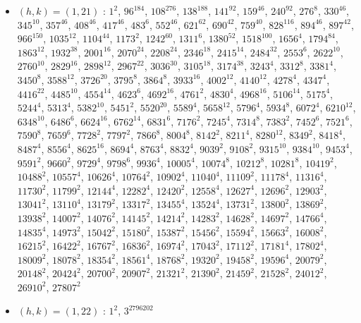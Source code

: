 \begin{itemize}
\item $(h,k)=(1,21)$ : $1^{2}$, $96^{184}$, $108^{276}$, $138^{188}$, $141^{92}$, $159^{46}$, $240^{92}$, $276^{8}$, $330^{46}$, $345^{10}$, $357^{46}$, $408^{46}$, $417^{46}$, $483^{6}$, $552^{46}$, $621^{62}$, $690^{42}$, $759^{40}$, $828^{116}$, $894^{46}$, $897^{42}$, $966^{150}$, $1035^{12}$, $1104^{44}$, $1173^{2}$, $1242^{60}$, $1311^{6}$, $1380^{52}$, $1518^{100}$, $1656^{4}$, $1794^{84}$, $1863^{12}$, $1932^{38}$, $2001^{16}$, $2070^{24}$, $2208^{24}$, $2346^{18}$, $2415^{14}$, $2484^{32}$, $2553^{6}$, $2622^{10}$, $2760^{10}$, $2829^{16}$, $2898^{12}$, $2967^{22}$, $3036^{30}$, $3105^{18}$, $3174^{38}$, $3243^{4}$, $3312^{8}$, $3381^{4}$, $3450^{8}$, $3588^{12}$, $3726^{20}$, $3795^{8}$, $3864^{8}$, $3933^{16}$, $4002^{12}$, $4140^{12}$, $4278^{4}$, $4347^{4}$, $4416^{22}$, $4485^{10}$, $4554^{14}$, $4623^{6}$, $4692^{16}$, $4761^{2}$, $4830^{4}$, $4968^{16}$, $5106^{14}$, $5175^{4}$, $5244^{4}$, $5313^{4}$, $5382^{10}$, $5451^{2}$, $5520^{20}$, $5589^{4}$, $5658^{12}$, $5796^{4}$, $5934^{8}$, $6072^{4}$, $6210^{12}$, $6348^{10}$, $6486^{6}$, $6624^{16}$, $6762^{14}$, $6831^{6}$, $7176^{2}$, $7245^{4}$, $7314^{8}$, $7383^{2}$, $7452^{6}$, $7521^{6}$, $7590^{8}$, $7659^{6}$, $7728^{2}$, $7797^{2}$, $7866^{8}$, $8004^{8}$, $8142^{2}$, $8211^{4}$, $8280^{12}$, $8349^{2}$, $8418^{4}$, $8487^{4}$, $8556^{4}$, $8625^{16}$, $8694^{4}$, $8763^{4}$, $8832^{4}$, $9039^{2}$, $9108^{2}$, $9315^{10}$, $9384^{10}$, $9453^{4}$, $9591^{2}$, $9660^{2}$, $9729^{4}$, $9798^{6}$, $9936^{4}$, $10005^{4}$, $10074^{8}$, $10212^{8}$, $10281^{8}$, $10419^{2}$, $10488^{2}$, $10557^{4}$, $10626^{4}$, $10764^{2}$, $10902^{4}$, $11040^{4}$, $11109^{2}$, $11178^{4}$, $11316^{4}$, $11730^{2}$, $11799^{2}$, $12144^{4}$, $12282^{4}$, $12420^{2}$, $12558^{4}$, $12627^{4}$, $12696^{2}$, $12903^{2}$, $13041^{2}$, $13110^{4}$, $13179^{2}$, $13317^{2}$, $13455^{4}$, $13524^{4}$, $13731^{2}$, $13800^{2}$, $13869^{2}$, $13938^{2}$, $14007^{2}$, $14076^{2}$, $14145^{2}$, $14214^{2}$, $14283^{2}$, $14628^{2}$, $14697^{2}$, $14766^{4}$, $14835^{4}$, $14973^{2}$, $15042^{2}$, $15180^{2}$, $15387^{2}$, $15456^{2}$, $15594^{2}$, $15663^{2}$, $16008^{2}$, $16215^{2}$, $16422^{2}$, $16767^{2}$, $16836^{2}$, $16974^{2}$, $17043^{2}$, $17112^{2}$, $17181^{4}$, $17802^{4}$, $18009^{2}$, $18078^{2}$, $18354^{2}$, $18561^{4}$, $18768^{2}$, $19320^{2}$, $19458^{2}$, $19596^{4}$, $20079^{2}$, $20148^{2}$, $20424^{2}$, $20700^{2}$, $20907^{2}$, $21321^{2}$, $21390^{2}$, $21459^{2}$, $21528^{2}$, $24012^{2}$, $26910^{2}$, $27807^{2}$
\item $(h,k)=(1,22)$ : $1^{2}$, $3^{2796202}$

\end{itemize}
